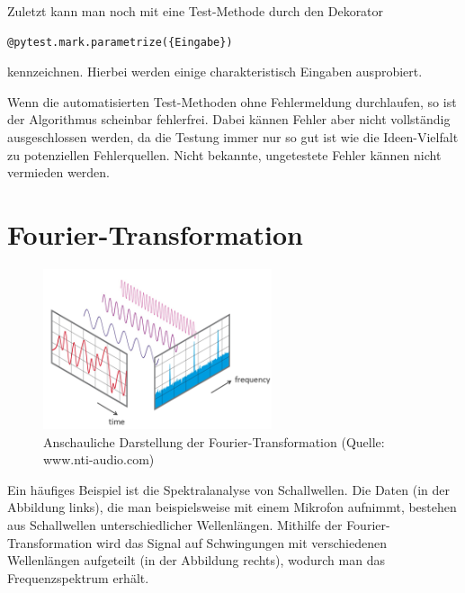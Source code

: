 \documentclass[]{dsadokumentation}
\begin{document}
Zuletzt kann man noch mit eine Test-Methode durch den Dekorator
\begin{verbatim}
@pytest.mark.parametrize({Eingabe})
\end{verbatim}
 kennzeichnen. Hierbei werden einige charakteristisch Eingaben ausprobiert.

Wenn die automatisierten Test-Methoden ohne Fehlermeldung durchlaufen, so ist der Algorithmus scheinbar fehlerfrei. Dabei kännen Fehler aber nicht vollständig ausgeschlossen werden, da die Testung immer nur so gut ist wie die Ideen-Vielfalt zu potenziellen Fehlerquellen. Nicht bekannte, ungetestete Fehler kännen nicht vermieden werden.

\section{Fourier-Transformation}


\begin{figure}[h!]
	\centering
	\includegraphics[width=0.6\textwidth]{k4.2/fourier.png}
	\caption{Anschauliche Darstellung der Fourier-Transformation (Quelle: www.nti-audio.com)}
\end{figure}

Ein häufiges Beispiel ist die Spektralanalyse von Schallwellen. Die Daten (in der Abbildung links), die man beispielsweise mit einem Mikrofon aufnimmt, bestehen aus Schallwellen unterschiedlicher Wellenlängen. Mithilfe der Fourier-Transformation wird das Signal auf Schwingungen mit verschiedenen Wellenl\"angen aufgeteilt (in der Abbildung rechts), wodurch man das Frequenzspektrum erhält.
\end{document}
